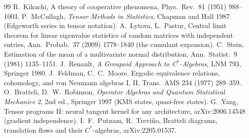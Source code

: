 \documentclass[11pt]{article}
\theoremstyle{plain}
\theoremstyle{definition}\newtheorem{definition}[theorem]{Definition}\newtheorem{remark}[theorem]{Remark}
\begin{document}
\begin{thebibliography}{99}
 R.~Kikuchi, A theory of cooperative phenomena, Phys.~Rev.~81 (1951) 988--1003.
 P.~McCullagh, \emph{Tensor Methods in Statistics}, Chapman and Hall 1987 (Edgeworth series in tensor notation).
 A.~Lytova, L.~Pastur, Central limit theorem for linear eigenvalue statistics of random matrices with independent entries, Ann.~Probab.~37 (2009) 1778--1840 (the cumulant expansion).
 C.~Stein, Estimation of the mean of a multivariate normal distribution, Ann.~Statist.~9 (1981) 1135--1151.
 J.~Renault, \emph{A Groupoid Approach to C$^*$-Algebras}, LNM 793, Springer 1980.
 J.~Feldman, C.~C.~Moore, Ergodic equivalence relations, cohomology, and von Neumann algebras I, II, Trans.~AMS 234 (1977) 289--359.
 O.~Bratteli, D.~W.~Robinson, \emph{Operator Algebras and Quantum Statistical Mechanics 2}, 2nd ed., Springer 1997 (KMS states, quasi-free states).
 G.~Yang, Tensor programs II: neural tangent kernel for any architecture, arXiv:2006.14548 (gradient independence).
 I.~F.~Putnam, R.~Trevi\~no, Bratteli diagrams, translation flows and their $C^*$-algebras, arXiv:2205.01537.
\end{thebibliography}
\end{document}
